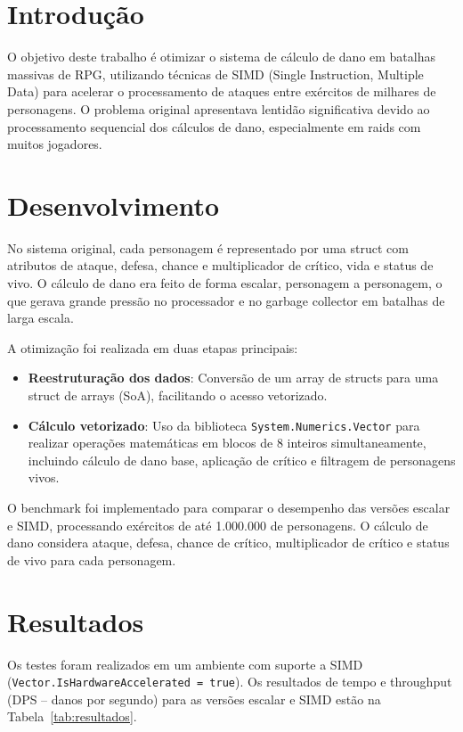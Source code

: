 \documentclass[
	12pt,
	oneside,
	a4paper,
	english,
	brazil,
	]{abntex2}
\begin{document}
\frenchspacing

\imprimircapa

\section{Introdução}
O objetivo deste trabalho é otimizar o sistema de cálculo de dano em batalhas massivas de RPG, utilizando técnicas de SIMD (Single Instruction, Multiple Data) para acelerar o processamento de ataques entre exércitos de milhares de personagens. O problema original apresentava lentidão significativa devido ao processamento sequencial dos cálculos de dano, especialmente em raids com muitos jogadores.

\section{Desenvolvimento}
No sistema original, cada personagem é representado por uma struct com atributos de ataque, defesa, chance e multiplicador de crítico, vida e status de vivo. O cálculo de dano era feito de forma escalar, personagem a personagem, o que gerava grande pressão no processador e no garbage collector em batalhas de larga escala.

A otimização foi realizada em duas etapas principais:
\begin{itemize}
    \item \textbf{Reestruturação dos dados}: Conversão de um array de structs para uma struct de arrays (SoA), facilitando o acesso vetorizado.
    \item \textbf{Cálculo vetorizado}: Uso da biblioteca \texttt{System.Numerics.Vector} para realizar operações matemáticas em blocos de 8 inteiros simultaneamente, incluindo cálculo de dano base, aplicação de crítico e filtragem de personagens vivos.
\end{itemize}

O benchmark foi implementado para comparar o desempenho das versões escalar e SIMD, processando exércitos de até 1.000.000 de personagens. O cálculo de dano considera ataque, defesa, chance de crítico, multiplicador de crítico e status de vivo para cada personagem.

\section{Resultados}
Os testes foram realizados em um ambiente com suporte a SIMD (\texttt{Vector.IsHardwareAccelerated = true}). Os resultados de tempo e throughput (DPS -- danos por segundo) para as versões escalar e SIMD estão na Tabela~\ref{tab:resultados}.
\end{document}
